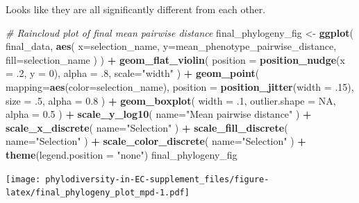 \documentclass[]{book}
\newenvironment{Shaded}{\begin{snugshade}}{\end{snugshade}}
\newcommand{\CommentTok}[1]{\textcolor[rgb]{0.56,0.35,0.01}{\textit{#1}}}
\newcommand{\DataTypeTok}[1]{\textcolor[rgb]{0.13,0.29,0.53}{#1}}
\newcommand{\DecValTok}[1]{\textcolor[rgb]{0.00,0.00,0.81}{#1}}
\newcommand{\FloatTok}[1]{\textcolor[rgb]{0.00,0.00,0.81}{#1}}
\newcommand{\KeywordTok}[1]{\textcolor[rgb]{0.13,0.29,0.53}{\textbf{#1}}}
\newcommand{\NormalTok}[1]{#1}
\newcommand{\OperatorTok}[1]{\textcolor[rgb]{0.81,0.36,0.00}{\textbf{#1}}}
\newcommand{\OtherTok}[1]{\textcolor[rgb]{0.56,0.35,0.01}{#1}}
\newcommand{\StringTok}[1]{\textcolor[rgb]{0.31,0.60,0.02}{#1}}
\begin{document}
Looks like they are all significantly different from each other.

\begin{Shaded}
\begin{Highlighting}[]
\CommentTok{# Raincloud plot of final mean pairwise distance}
\NormalTok{final_phylogeny_fig <-}\StringTok{ }\KeywordTok{ggplot}\NormalTok{(}
\NormalTok{    final_data,}
    \KeywordTok{aes}\NormalTok{(}
      \DataTypeTok{x=}\NormalTok{selection_name,}
      \DataTypeTok{y=}\NormalTok{mean_phenotype_pairwise_distance,}
      \DataTypeTok{fill=}\NormalTok{selection_name}
\NormalTok{    )}
\NormalTok{  ) }\OperatorTok{+}
\StringTok{  }\KeywordTok{geom_flat_violin}\NormalTok{(}
    \DataTypeTok{position =} \KeywordTok{position_nudge}\NormalTok{(}\DataTypeTok{x =} \FloatTok{.2}\NormalTok{, }\DataTypeTok{y =} \DecValTok{0}\NormalTok{),}
    \DataTypeTok{alpha =} \FloatTok{.8}\NormalTok{,}
    \DataTypeTok{scale=}\StringTok{"width"}
\NormalTok{  ) }\OperatorTok{+}
\StringTok{  }\KeywordTok{geom_point}\NormalTok{(}
    \DataTypeTok{mapping=}\KeywordTok{aes}\NormalTok{(}\DataTypeTok{color=}\NormalTok{selection_name),}
    \DataTypeTok{position =} \KeywordTok{position_jitter}\NormalTok{(}\DataTypeTok{width =} \FloatTok{.15}\NormalTok{),}
    \DataTypeTok{size =} \FloatTok{.5}\NormalTok{,}
    \DataTypeTok{alpha =} \FloatTok{0.8}
\NormalTok{  ) }\OperatorTok{+}
\StringTok{  }\KeywordTok{geom_boxplot}\NormalTok{(}
    \DataTypeTok{width =} \FloatTok{.1}\NormalTok{,}
    \DataTypeTok{outlier.shape =} \OtherTok{NA}\NormalTok{,}
    \DataTypeTok{alpha =} \FloatTok{0.5}
\NormalTok{  ) }\OperatorTok{+}
\StringTok{  }\KeywordTok{scale_y_log10}\NormalTok{(}
    \DataTypeTok{name=}\StringTok{"Mean pairwise distance"}
\NormalTok{  ) }\OperatorTok{+}
\StringTok{  }\KeywordTok{scale_x_discrete}\NormalTok{(}
    \DataTypeTok{name=}\StringTok{"Selection"}
\NormalTok{  ) }\OperatorTok{+}
\StringTok{  }\KeywordTok{scale_fill_discrete}\NormalTok{(}
    \DataTypeTok{name=}\StringTok{"Selection"}
\NormalTok{  ) }\OperatorTok{+}
\StringTok{  }\KeywordTok{scale_color_discrete}\NormalTok{(}
    \DataTypeTok{name=}\StringTok{"Selection"}
\NormalTok{  ) }\OperatorTok{+}\StringTok{ }
\StringTok{  }\KeywordTok{theme}\NormalTok{(}\DataTypeTok{legend.position =} \StringTok{"none"}\NormalTok{)}
\NormalTok{final_phylogeny_fig}
\end{Highlighting}
\end{Shaded}

\texttt{[image: phylodiversity-in-EC-supplement\_files/figure-latex/final\_phylogeny\_plot\_mpd-1.pdf]}
\end{document}
